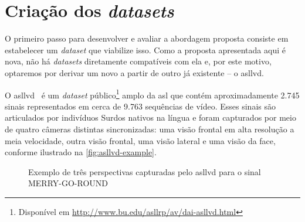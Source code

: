 \section{Criação dos \textit{datasets}}
\label{sec:metodologia-datasets}

O primeiro passo para desenvolver e avaliar a abordagem proposta consiste em estabelecer um \textit{dataset} que viabilize isso. Como a proposta apresentada aqui é nova, não há \textit{datasets} diretamente compatíveis com ela e, por este motivo, optaremos por derivar um novo a partir de outro já existente -- o \acrfull{asllvd}.

O \acrshort{asllvd}~\cite{athitsos-2008-asllvd,neidle-2012-asllvd} é um \textit{dataset} público\footnote{Disponível em \url{http://www.bu.edu/asllrp/av/dai-asllvd.html}} amplo da \acrshort{asl} que contém aproximadamente 2.745 sinais representados em cerca de 9.763 sequências de vídeo. Esses sinais são articulados por indivíduos Surdos nativos na língua e foram capturados por meio de quatro câmeras distintas sincronizadas: uma visão frontal em alta resolução a meia velocidade, outra visão frontal, uma visão lateral e uma visão da face, conforme ilustrado na \autoref{fig:asllvd-example}.

\begin{figure}[ht!]
    \centering
    \caption{\textmd{Exemplo de três perspectivas capturadas pelo \acrshort{asllvd} para o sinal MERRY-GO-ROUND}}
    \label{fig:asllvd-example}
\end{figure}


